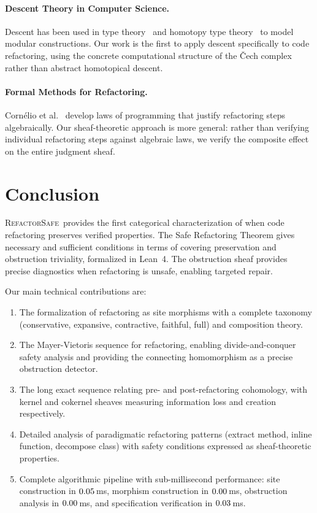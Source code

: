 \documentclass[11pt]{article}
\newcommand{\RefactorSafe}{\textsc{RefactorSafe}}
\begin{document}
\paragraph{Descent Theory in Computer Science.}
Descent has been used in type theory~\cite{Shulman2015} and homotopy
type theory~\cite{UFP2013} to model modular constructions.  Our work is
the first to apply descent specifically to code refactoring, using the
concrete computational structure of the Čech complex rather than
abstract homotopical descent.

\paragraph{Formal Methods for Refactoring.}
Cornélio et al.~\cite{Cornelio2010} develop laws of programming that
justify refactoring steps algebraically.  Our sheaf-theoretic approach
is more general: rather than verifying individual refactoring steps
against algebraic laws, we verify the composite effect on the entire
judgment sheaf.

\section{Conclusion}\label{sec:conclusion}

\RefactorSafe\ provides the first categorical characterization of when
code refactoring preserves verified properties.  The Safe Refactoring
Theorem gives necessary and sufficient conditions in terms of covering
preservation and obstruction triviality, formalized in Lean~4.  The
obstruction sheaf provides precise diagnostics when refactoring is
unsafe, enabling targeted repair.

Our main technical contributions are:
\begin{enumerate}[noitemsep]
  \item The formalization of refactoring as site morphisms with a
        complete taxonomy (conservative, expansive, contractive,
        faithful, full) and composition theory.
  \item The Mayer-Vietoris sequence for refactoring, enabling
        divide-and-conquer safety analysis and providing the
        connecting homomorphism as a precise obstruction detector.
  \item The long exact sequence relating pre- and post-refactoring
        cohomology, with kernel and cokernel sheaves measuring
        information loss and creation respectively.
  \item Detailed analysis of paradigmatic refactoring patterns (extract
        method, inline function, decompose class) with safety
        conditions expressed as sheaf-theoretic properties.
  \item Complete algorithmic pipeline with sub-millisecond performance:
        site construction in $0.05$\,ms, morphism
        construction in $0.00$\,ms, obstruction
        analysis in $0.00$\,ms, and
        specification verification in
        $0.03$\,ms.
\end{enumerate}
\end{document}
